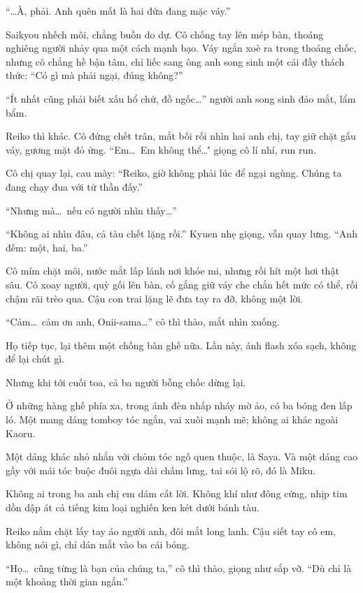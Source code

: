 \documentclass[../main.tex]{subfiles}
\begin{document}
``\dots À, phải. Anh quên mất là hai đứa đang mặc váy.''

Saikyou nhếch môi, chẳng buồn do dự. Cô chống tay lên mép bàn, thoáng nghiêng người nhảy qua một cách mạnh bạo. Váy ngắn xoè ra trong thoáng chốc, nhưng cô chẳng hề bận tâm, chỉ liếc sang ông anh song sinh một cái đầy thách thức: ``Có gì mà phải ngại, đúng không?''

``Ít nhất cũng phải biết xấu hổ chứ, đồ ngốc\dots'' người anh song sinh đảo mắt, lẩm bẩm.

Reiko thì khác. Cô đứng chết trân, mắt bối rối nhìn hai anh chị, tay giữ chặt gấu váy, gương mặt đỏ ửng. ``Em\dots\ Em không thể\dots\'' giọng cô lí nhí, run run.

Cô chị quay lại, cau mày: ``Reiko, giờ không phải lúc để ngại ngùng. Chúng ta đang chạy đua với tử thần đấy.''

``Nhưng mà\dots\ nếu có người nhìn thấy\dots''

``Không ai nhìn đâu, cả tàu chết lặng rồi.'' Kyuen nhẹ giọng, vẫn quay lưng. ``Anh đếm: một, hai, ba.''

Cô mím chặt môi, nước mắt lấp lánh nơi khóe mi, nhưng rồi hít một hơi thật sâu. Cô xoay người, quỳ gối lên bàn, cố gắng giữ váy che chắn hết mức có thể, rồi chậm rãi trèo qua. Cậu con trai lặng lẽ đưa tay ra đỡ, không một lời.

``Cảm\dots\ cảm ơn anh, Onii-sama\dots'' cô thì thào, mắt nhìn xuống.

Họ tiếp tục, lại thêm một chồng bàn ghế nữa. Lần này, ánh flash xóa sạch, không để lại chút gì.

Nhưng khi tới cuối toa, cả ba người bỗng chốc dừng lại.

Ở những hàng ghế phía xa, trong ánh đèn nhấp nháy mờ ảo, có ba bóng đen lấp ló. Một mang dáng tomboy tóc ngắn, vai xuôi mạnh mẽ; không ai khác ngoài Kaoru.

Một dáng khác nhỏ nhắn với chỏm tóc ngố quen thuộc, là Saya. Và một dáng cao gầy với mái tóc buộc đuôi ngựa dài chấm lưng, tai sói lộ rõ, đó là Miku.

Không ai trong ba anh chị em dám cất lời. Không khí như đông cứng, nhịp tim dồn dập át cả tiếng kim loại nghiến ken két dưới bánh tàu.

Reiko nắm chặt lấy tay áo người anh, đôi mắt long lanh. Cậu siết tay cô em, không nói gì, chỉ dán mắt vào ba cái bóng.

``Họ\dots\ cũng từng là bạn của chúng ta,'' cô thì thào, giọng như sắp vỡ. ``Dù chỉ là một khoảng thời gian ngắn.''
\end{document}
